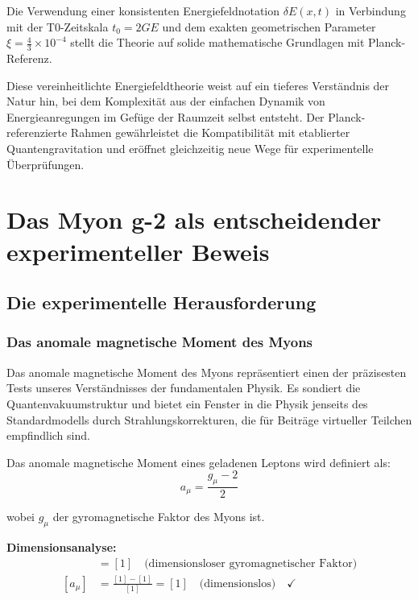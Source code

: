 \documentclass[12pt,a4paper]{report}
\newcommand{\tzero}{t_0}                  %
\begin{document}
	Die Verwendung einer konsistenten Energiefeldnotation $\delta E(x,t)$ in Verbindung mit der T0-Zeitskala $\tzero = 2GE$ und dem exakten geometrischen Parameter $\xi = \frac{4}{3} \times 10^{-4}$ stellt die Theorie auf solide mathematische Grundlagen mit Planck-Referenz.
	
	Diese vereinheitlichte Energiefeldtheorie weist auf ein tieferes Verständnis der Natur hin, bei dem Komplexität aus der einfachen Dynamik von Energieanregungen im Gefüge der Raumzeit selbst entsteht. Der Planck-referenzierte Rahmen gewährleistet die Kompatibilität mit etablierter Quantengravitation und eröffnet gleichzeitig neue Wege für experimentelle Überprüfungen.

	\chapter{Das Myon g-2 als entscheidender experimenteller Beweis}
	\label{chap:muon_g2}
	
	\section{Die experimentelle Herausforderung}
	\label{sec:muon_g2_experiment}
	
	\subsection{Das anomale magnetische Moment des Myons}
	\label{subsec:anomalous_magnetic_moment}
	
	Das anomale magnetische Moment des Myons repräsentiert einen der präzisesten Tests unseres Verständnisses der fundamentalen Physik. Es sondiert die Quantenvakuumstruktur und bietet ein Fenster in die Physik jenseits des Standardmodells durch Strahlungskorrekturen, die für Beiträge virtueller Teilchen empfindlich sind.
	
	Das anomale magnetische Moment eines geladenen Leptons wird definiert als:
	\begin{equation}
		a_\mu = \frac{g_\mu - 2}{2}
		\label{eq:anomalous_moment_definition}
	\end{equation}
	
	wobei $g_\mu$ der gyromagnetische Faktor des Myons ist.
	
	\textbf{Dimensionsanalyse:}
	\begin{align}
		[g_\mu] &= [1] \quad \text{(dimensionsloser gyromagnetischer Faktor)} \\
		[a_\mu] &= \frac{[1] - [1]}{[1]} = [1] \quad \text{(dimensionslos)} \quad \checkmark
	\end{align}
	
\end{document}
